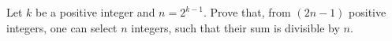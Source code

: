 Let $k$ be a positive integer and $n = 2^{k-1}$. Prove that, from $(2n - 1)$ positive integers, one can select $n$ integers, such that their sum is divisible by $n$.
